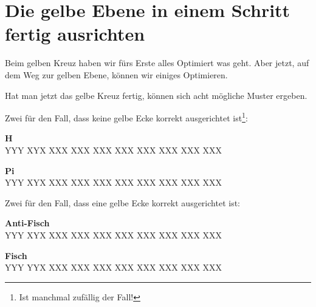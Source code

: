 \section{Die gelbe Ebene in einem Schritt fertig ausrichten}
Beim gelben Kreuz haben wir fürs Erste alles Optimiert was geht.
Aber jetzt, auf dem Weg zur gelben Ebene, können wir einiges Optimieren.

Hat man jetzt das gelbe Kreuz fertig, können sich acht mögliche Muster ergeben.

Zwei für den Fall, dass keine gelbe Ecke korrekt ausgerichtet ist\footnote{Ist manchmal zufällig der Fall!}:
\parbox{0.5\linewidth}{
	\begin{center}
		\textbf{H}\\[1ex]
		\RubikCubeGreyAll%
		{Y}{Y}{Y}
		{X}{Y}{X}%
			 {X}{X}{X}
			 {X}{X}{X}%
			 {X}{X}{X}
			 {X}{X}{X}%
			{X}{X}{X}
			{X}{X}{X}%
			{X}{X}{X}
			{X}{X}{X}%
	\end{center}
}\parbox{0.5\linewidth}{
	\begin{center}
		\textbf{Pi}\\[1ex]
		\RubikCubeGreyAll%
		{Y}{Y}{Y}
		{X}{Y}{X}%
			 {X}{X}{X}
			 {X}{X}{X}%
			 {X}{X}{X}
			 {X}{X}{X}%
			{X}{X}{X}
			{X}{X}{X}%
			{X}{X}{X}
			{X}{X}{X}%
	\end{center}
}

Zwei für den Fall, dass eine gelbe Ecke korrekt ausgerichtet ist:
\parbox{0.5\linewidth}{
	\begin{center}
		\textbf{Anti-Fisch} \\[1ex]
		\RubikCubeGreyAll%
					{Y}{Y}{Y}
					{X}{Y}{X}%
			 {X}{X}{X}
			 {X}{X}{X}%
			 {X}{X}{X}
			 {X}{X}{X}%
			{X}{X}{X}
			{X}{X}{X}%
			{X}{X}{X}
			{X}{X}{X}%
	\end{center}
}\parbox{0.5\linewidth}{
	\begin{center}
		\textbf{Fisch} \\[1ex]
		\RubikCubeGreyAll%
					{Y}{Y}{Y}
					{Y}{Y}{X}%
			 {X}{X}{X}
			 {X}{X}{X}%
			 {X}{X}{X}
			 {X}{X}{X}%
			{X}{X}{X}
			{X}{X}{X}%
			{X}{X}{X}
			{X}{X}{X}%
	\end{center}
}

